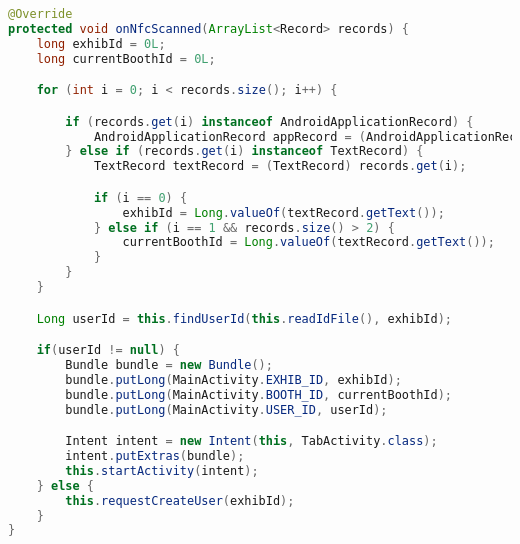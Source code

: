 \begin{lstlisting}[language=java, label=lst:onNfcScanned, caption=onNfcScanned]
@Override
protected void onNfcScanned(ArrayList<Record> records) {
    long exhibId = 0L;
    long currentBoothId = 0L;

    for (int i = 0; i < records.size(); i++) {

        if (records.get(i) instanceof AndroidApplicationRecord) {
            AndroidApplicationRecord appRecord = (AndroidApplicationRecord) records.get(i);
        } else if (records.get(i) instanceof TextRecord) {
            TextRecord textRecord = (TextRecord) records.get(i);

            if (i == 0) {
                exhibId = Long.valueOf(textRecord.getText());
            } else if (i == 1 && records.size() > 2) {
                currentBoothId = Long.valueOf(textRecord.getText());
            }
        }
    }

    Long userId = this.findUserId(this.readIdFile(), exhibId);

    if(userId != null) {
        Bundle bundle = new Bundle();
        bundle.putLong(MainActivity.EXHIB_ID, exhibId);
        bundle.putLong(MainActivity.BOOTH_ID, currentBoothId);
        bundle.putLong(MainActivity.USER_ID, userId);

        Intent intent = new Intent(this, TabActivity.class);
        intent.putExtras(bundle);
        this.startActivity(intent);
    } else {
        this.requestCreateUser(exhibId);
    }
}
\end{lstlisting}
